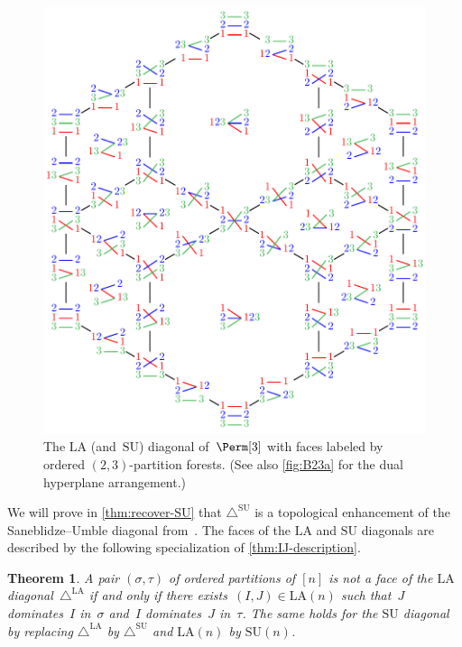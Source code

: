 \documentclass{amsart}
\newtheorem{theorem}{Theorem}[section]
\theoremstyle{definition}
\newcommand{\SU}{\mathrm{SU}}
\newcommand{\LA}{\mathrm{LA}}
\newcommand{\SUD}{\triangle^{\mathrm{SU}}}
\newcommand{\LAD}{\triangle^{\mathrm{LA}}}
\begin{document}
\begin{figure}
	\centerline{\includegraphics[scale=.85]{diagonalPermutahedron3}}
	\caption{The $\LA$ (and~$\SU$) diagonal of~$\Perm[3]$ with faces labeled by ordered $(2,3)$-partition forests. (See also \cref{fig:B23a} for the dual hyperplane arrangement.)}
	\label{fig:LUSAdiagonals}
\end{figure}

We will prove in \cref{thm:recover-SU} that $\SUD$ is a topological enhancement of the Saneblidze--Umble diagonal from~\cite{SaneblidzeUmble}.
The faces of the $\LA$ and $\SU$ diagonals are described by the following specialization of \cref{thm:IJ-description}.

\begin{theorem}
\label{thm:minimal}
A pair $(\sigma,\tau)$ of ordered partitions of $[n]$ is not a face of the $\LA$ diagonal~$\LAD$ if and only if there exists~$(I,J) \in \LA(n)$ such that~$J$ dominates~$I$ in~$\sigma$ and~$I$ dominates~$J$ in~$\tau$.
The same holds for the $\SU$ diagonal by replacing $\LAD$ by $\SUD$ and $\LA(n)$ by $\SU(n)$.
\end{theorem}
\end{document}
